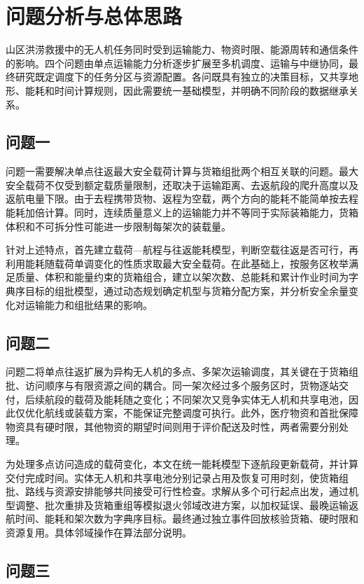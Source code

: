 \documentclass[bwprint]{gmcmthesis}
\begin{document}
\section{问题分析与总体思路}

山区洪涝救援中的无人机任务同时受到运输能力、物资时限、能源周转和通信条件的影响。四个问题由单点运输能力分析逐步扩展至多机调度、运输与中继协同，最终研究既定调度下的任务分区与资源配置。各问既具有独立的决策目标，又共享地形、能耗和时间计算规则，因此需要统一基础模型，并明确不同阶段的数据继承关系。

\subsection{问题一}

问题一需要解决单点往返最大安全载荷计算与货箱组批两个相互关联的问题。最大安全载荷不仅受到额定载质量限制，还取决于运输距离、去返航段的爬升高度以及返航电量下限。由于去程携带货物、返程为空载，两个方向的能耗不能简单按去程能耗加倍计算。同时，连续质量意义上的运输能力并不等同于实际装箱能力，货箱体积和不可拆分性可能进一步限制每架次的装载量。

针对上述特点，首先建立载荷—航程与往返能耗模型，判断空载往返是否可行，再利用能耗随载荷单调变化的性质求取最大安全载荷。在此基础上，按服务区枚举满足质量、体积和能量约束的货箱组合，建立以架次数、总能耗和累计作业时间为字典序目标的组批模型，通过动态规划确定机型与货箱分配方案，并分析安全余量变化对运输能力和组批结果的影响。

\subsection{问题二}

问题二将单点往返扩展为异构无人机的多点、多架次运输调度，其关键在于货箱组批、访问顺序与有限资源之间的耦合。同一架次经过多个服务区时，货物逐站交付，后续航段的载荷及能耗随之变化；不同架次又竞争实体无人机和共享电池，因此仅优化航线或装载方案，不能保证完整调度可执行。此外，医疗物资和首批保障物资具有硬时限，其他物资的期望时间则用于评价配送及时性，两者需要分别处理。

为处理多点访问造成的载荷变化，本文在统一能耗模型下逐航段更新载荷，并计算交付完成时间。实体无人机和共享电池分别记录占用及恢复可用时刻，使货箱组批、路线与资源安排能够共同接受可行性检查。求解从多个可行起点出发，通过机型调整、批次重排及货箱重组等模拟退火邻域改进方案，以加权延误、最晚运输返航时间、能耗和架次数为字典序目标。最终通过独立事件回放核验货箱、硬时限和资源复用。具体邻域操作在算法部分说明。

\subsection{问题三}
\end{document}

